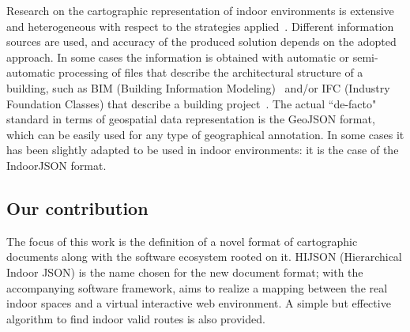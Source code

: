 \documentclass[]{egpubl}
\begin{document}
Research on the cartographic representation of indoor environments is
extensive and heterogeneous with respect to the strategies
applied~\cite{6418876}. Different information sources are used, and accuracy
of the produced solution depends on the adopted approach. In some cases the
information is obtained with automatic or semi-automatic processing of files
that describe the architectural structure of a building, such as BIM (Building
Information Modeling)~\cite{Eastman:2008:BHG:1796500} and/or IFC (Industry
Foundation Classes) that describe a building project~\cite{6816739}.  The actual ``de-facto" 
standard in terms of geospatial data representation is the GeoJSON
format, which can be easily used for any type of geographical annotation. In
some cases it has been slightly adapted to be used in indoor environments: it
is the case of the IndoorJSON format.



\subsection{Our contribution}

The focus of this work is the definition of a novel format of cartographic
documents along with the software ecosystem rooted on it. HIJSON (Hierarchical
Indoor JSON) is the name chosen for the new document format; with the
accompanying software framework, aims to realize a mapping between the real
indoor spaces and a virtual interactive web environment. A simple but
effective algorithm to find indoor valid routes is also provided.


\end{document}
